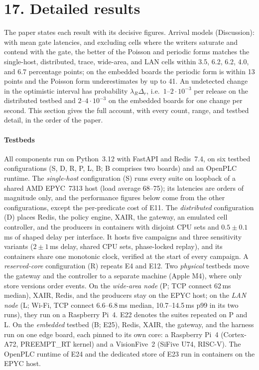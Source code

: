 \documentclass[11pt]{article}
\begin{document}
\section*{17. Detailed results}
The paper states each result with its decisive figures. Arrival models (Discussion): with mean gate latencies, and excluding cells where the writers saturate and contend with the gate, the better of the Poisson and periodic forms matches the single-host, distributed, trace, wide-area, and LAN cells within 3.5, 6.2, 6.2, 4.0, and 6.7 percentage points; on the embedded boards the periodic form is within 13 points and the Poisson form underestimates by up to 41. An undetected change in the optimistic interval has probability $\lambda_R\Delta_r$, i.e.\ $1$--$2\cdot10^{-3}$ per release on the distributed testbed and $2$--$4\cdot10^{-3}$ on the embedded boards for one change per second. This section gives the full account, with every count, range, and testbed detail, in the order of the paper.

\paragraph{Testbeds}
All components run on Python~3.12 with FastAPI and Redis~7.4, on six testbed configurations (S, D, R, P, L, B; B comprises two boards) and an OpenPLC runtime. The \emph{single-host} configuration (S) runs every suite on loopback of a shared AMD EPYC~7313 host (load average 68--75); its latencies are orders of magnitude only, and the performance figures below come from the other configurations, except the per-predicate cost of E11. The \emph{distributed} configuration (D) places Redis, the policy engine, XAIR, the gateway, an emulated cell controller, and the producers in containers with disjoint CPU sets and $0.5\pm0.1$\,ms of shaped delay per interface. It hosts five campaigns and three sensitivity variants ($2\pm1$\,ms delay, shared CPU sets, phase-locked replay), and its containers share one monotonic clock, verified at the start of every campaign. A \emph{reserved-core} configuration (R) repeats E4 and E12. Two \emph{physical} testbeds move the gateway and the controller to a separate machine (Apple M4), where only store versions order events. On the \emph{wide-area node} (P; TCP connect 62\,ms median), XAIR, Redis, and the producers stay on the EPYC host; on the \emph{LAN node} (L; Wi-Fi, TCP connect 6.6--6.8\,ms median, 10.7--14.5\,ms p99 in its two runs), they run on a Raspberry Pi~4. E22 denotes the suites repeated on P and L. On the \emph{embedded} testbed (B; E25), Redis, XAIR, the gateway, and the harness run on one edge board, each pinned to its own core: a Raspberry Pi~4 (Cortex-A72, PREEMPT\_RT kernel) and a VisionFive~2 (SiFive U74, RISC-V). The OpenPLC runtime of E24 and the dedicated store of E23 run in containers on the EPYC host.
\end{document}
